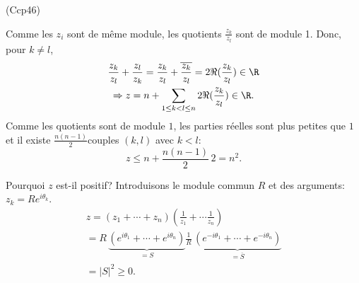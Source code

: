 \begin{tiny}(Ccp46)\end{tiny} Comme les $z_i$ sont de même module, les quotients $\frac{z_k}{z_l}$ sont de module 1. Donc, pour $k \neq l$,
\begin{multline*}
  \frac{z_k}{z_l} + \frac{z_l}{z_k} = \frac{z_k}{z_l} + \overline{\frac{z_k}{z_l}} = 2 \Re( \frac{z_k}{z_l}) \in \R \\
  \Rightarrow z = n + \sum_{1\leq k < l \leq n}2 \Re( \frac{z_k}{z_l}) \in \R.
\end{multline*}
Comme les quotients sont de module $1$, les parties réelles sont plus petites que $1$ et il existe $\frac{n(n-1)}{2}$couples $(k,l)$ avec $k < l$:
\begin{displaymath}
  z \leq n + \frac{n(n-1)}{2}\, 2 = n^2.
\end{displaymath}

Pourquoi $z$ est-il positif? Introduisons le module commun $R$ et des arguments: $z_k = R e^{i\theta_k}$.
\begin{multline*}
  z = (z_1 + \cdots + z_n)(\frac{1}{z_1} + \cdots \frac{1}{z_n}) \\
  = R\,\underset{ = S}{\underbrace{(e^{i \theta_1} + \cdots + e^{i \theta_n})}}
  \frac{1}{R}\,\underset{ = \overline{S}}{\underbrace{(e^{-i \theta_1} + \cdots + e^{-i \theta_n})}} \\
  = |S|^2 \geq 0.
\end{multline*}
